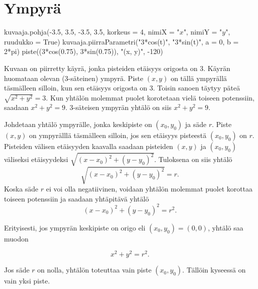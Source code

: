 \section{Ympyrä}


\begin{kuva}
    kuvaaja.pohja(-3.5, 3.5, -3.5, 3.5, korkeus = 4, nimiX = "$x$", nimiY = "$y$", ruudukko = True)
    kuvaaja.piirraParametri("3*cos(t)", "3*sin(t)", a = 0, b = 2*pi)
    piste((3*cos(0.75), 3*sin(0.75)), "(x, y)", -120)
\end{kuva}

Kuvaan on piirretty käyrä, jonka pisteiden etäisyys origosta on 3. Käyrän huomataan olevan ($3$-säteinen) ympyrä. Piste $(x, y)$ on tällä ympyrällä täsmälleen silloin, kun sen etäisyys origosta on 3. Toisin sanoen täytyy päteä $\sqrt{x^2+y^2}=3$. Kun yhtälön molemmat puolet korotetaan vielä toiseen potenssiin, saadaan $x^2+y^2=9$. $3$-säteisen ympyrän yhtälö on siis $x^2+y^2=9$.


Johdetaan yhtälö ympyrälle, jonka keskipiste on $(x_0, y_0)$ ja säde $r$. Piste $(x, y)$ on ympyrälllä täsmälleen silloin, jos sen etäisyys pisteestä $(x_0, y_0)$ on $r$. Pisteiden välisen etäisyyden kaavalla saadaan pisteiden $(x, y)$ ja $(x_0, y_0)$ väliseksi etäisyydeksi $\sqrt{(x-x_0)^2+(y-y_0)^2}$. Tuloksena on siis yhtälö
\[
\sqrt{(x-x_0)^2+(y-y_0)^2}=r.
\]
Koska säde $r$ ei voi olla negatiivinen, voidaan yhtälön molemmat puolet korottaa toiseen potenssiin ja saadaan yhtäpitävä yhtälö
\[
(x-x_0)^2+(y-y_0)^2=r^2.
\]

Erityisesti, jos ympyrän keskipiste on origo eli $(x_{0}, y_{0})= (0, 0)$, yhtälö saa muodon

\[
x^{2}+y^{2} = r^{2}.
\]


Jos säde $r$ on nolla, yhtälön toteuttaa vain piste $(x_{0}, y_{0})$. Tällöin kyseessä on vain yksi piste.


